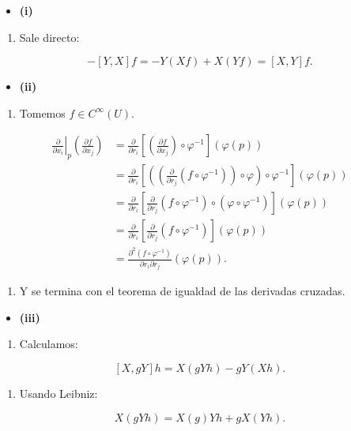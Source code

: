\begin{bookproof}{}
\begin{itemize}
\item \textbf{(i)}
\end{itemize}
\begin{enumerate}
\item Sale directo:
\end{enumerate}
\[
-[Y,X]f=-Y(Xf)+X(Yf)=[X,Y]f.
\]
\begin{itemize}
\item \textbf{(ii)}
\end{itemize}
\begin{enumerate}
\item Tomemos $f\in C^\infty(U)$.
\end{enumerate}
\[
\begin{aligned}\left.\frac{\partial}{\partial x_i}\right|_p\left(\frac{\partial f}{\partial x_j}\right)&=\frac{\partial}{\partial r_i}\left[\left(\frac{\partial f}{\partial x_j}\right)\circ\varphi^{-1}\right](\varphi(p))\\&=\frac{\partial}{\partial r_i}\left[\left(\left(\frac{\partial}{\partial r_j}(f\circ\varphi^{-1})\right)\circ\varphi\right)\circ\varphi^{-1}\right](\varphi(p))\\&=\frac{\partial}{\partial r_i}\left[\frac{\partial}{\partial r_j}(f\circ\varphi^{-1})\circ(\varphi\circ\varphi^{-1})\right](\varphi(p))\\&=\frac{\partial}{\partial r_i}\left[\frac{\partial}{\partial r_j}(f\circ\varphi^{-1})\right](\varphi(p))\\&=\frac{\partial^2(f\circ\varphi^{-1})}{\partial r_i\partial r_j}(\varphi(p)).\end{aligned}
\]
\begin{enumerate}[start=2]
\item Y se termina con el teorema de igualdad de las derivadas cruzadas.
\end{enumerate}
\begin{itemize}
\item \textbf{(iii)}
\end{itemize}
\begin{enumerate}
\item Calculamos:
\end{enumerate}
\[
[X,gY]h=X(gYh)-gY(Xh).
\]
\begin{enumerate}[start=2]
\item Usando Leibniz:
\end{enumerate}
\[
X(gYh)=X(g)Yh+gX(Yh).
\]
\begin{enumerate}[start=3]

\end{enumerate}
\end{bookproof}
